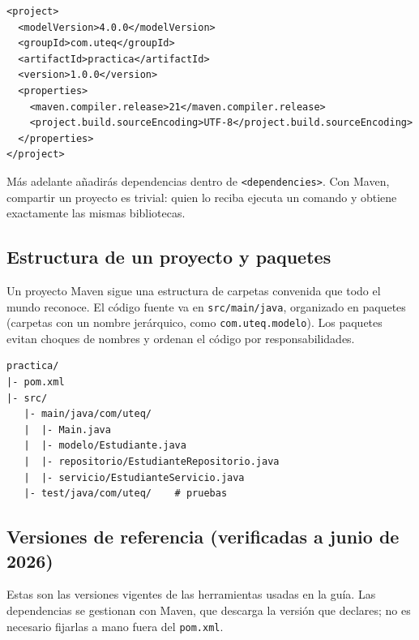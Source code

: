 \documentclass[11pt]{article}
\begin{document}
\begin{cajacodigo}
\begin{lstlisting}[style=xml]
<project>
  <modelVersion>4.0.0</modelVersion>
  <groupId>com.uteq</groupId>
  <artifactId>practica</artifactId>
  <version>1.0.0</version>
  <properties>
    <maven.compiler.release>21</maven.compiler.release>
    <project.build.sourceEncoding>UTF-8</project.build.sourceEncoding>
  </properties>
</project>
\end{lstlisting}
\end{cajacodigo}
\vspace{2pt}
Más adelante añadirás dependencias dentro de \texttt{\textless{}dependencies\textgreater{}}. Con Maven, compartir un proyecto es trivial: quien lo reciba ejecuta un comando y obtiene exactamente las mismas bibliotecas.

\subsection{Estructura de un proyecto y paquetes}
Un proyecto Maven sigue una estructura de carpetas convenida que todo el mundo reconoce. El código fuente va en \texttt{src/\allowbreak{}main/\allowbreak{}java}, organizado en paquetes (carpetas con un nombre jerárquico, como \texttt{com.\allowbreak{}uteq.\allowbreak{}modelo}). Los paquetes evitan choques de nombres y ordenan el código por responsabilidades.

\begin{cajacodigo}
\begin{lstlisting}[style=markup]
practica/
|- pom.xml
|- src/
   |- main/java/com/uteq/
   |  |- Main.java
   |  |- modelo/Estudiante.java
   |  |- repositorio/EstudianteRepositorio.java
   |  |- servicio/EstudianteServicio.java
   |- test/java/com/uteq/    # pruebas
\end{lstlisting}
\end{cajacodigo}
\vspace{2pt}
\subsection{Versiones de referencia (verificadas a junio de 2026)}
Estas son las versiones vigentes de las herramientas usadas en la guía. Las dependencias se gestionan con Maven, que descarga la versión que declares; no es necesario fijarlas a mano fuera del \texttt{pom.\allowbreak{}xml}.
\end{document}
